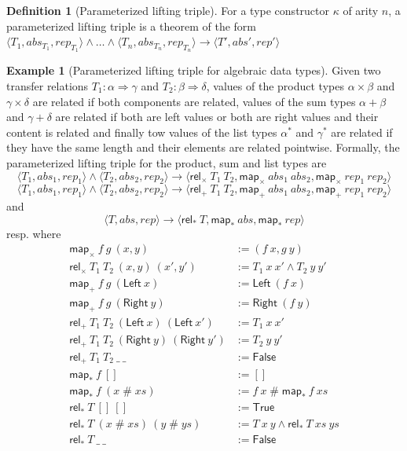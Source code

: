 \documentclass[]{article}
\theoremstyle{definition}
\newtheorem{definition}{Definition}[section]
\newtheorem{example}{Example}[section]
\newcommand{\mapsum}{\mathsf{map_+}}
\newcommand{\mapprod}{\mathsf{map_\times}}
\newcommand{\maplist}{\mathsf{map_\ast}}
\newcommand{\relsum}{\mathsf{rel_+}}
\newcommand{\relprod}{\mathsf{rel_\times}}
\newcommand{\rellist}{\mathsf{rel_\ast}}
\newcommand{\Left}{\mathsf{Left}}
\newcommand{\Right}{\mathsf{Right}}
\newcommand{\true}{\mathsf{True}}
\newcommand{\false}{\mathsf{False}}
\newcommand{\cons}{\mathbin{\#}}
\begin{document}
\begin{definition}[Parameterized lifting triple]
	For a type constructor \(\kappa\) of arity \(n\), a parameterized lifting triple is a theorem of the form \(\langle T_1, abs_{T_1}, rep_{T_1}\rangle \land \ldots \land \langle T_n, abs_{T_n}, rep_{T_n}\rangle \longrightarrow \langle T', abs', rep' \rangle\)
\end{definition}

\begin{example}[Parameterized lifting triple for algebraic data types]
	Given two transfer relations \(T_1 : \alpha \Rightarrow \gamma\) and \(T_2 : \beta \Rightarrow \delta\), values of the product types \(\alpha \times \beta\) and \(\gamma \times \delta\) are related if both components are related, values of the sum types \(\alpha + \beta\) and \(\gamma + \delta\) are related if both are left values or both are right values and their content is related and finally tow values of the list types \(\alpha^\ast\) and \(\gamma^\ast\) are related if they have the same length and their elements are related pointwise. Formally, the parameterized lifting triple for the product, sum and list types are
	\begin{equation*}
		\langle T_1, abs_1, rep_1 \rangle \land \langle T_2, abs_2, rep_2 \rangle \longrightarrow \langle \relprod\ T_1\ T_2, \mapprod\ abs_1\ abs_2, \mapprod\ rep_1\ rep_2 \rangle
	\end{equation*}
	\begin{equation*}
		\langle T_1, abs_1, rep_1 \rangle \land \langle T_2, abs_2, rep_2 \rangle \longrightarrow \langle \relsum\ T_1\ T_2, \mapsum\ abs_1\ abs_2, \mapsum\ rep_1\ rep_2 \rangle
	\end{equation*}
	and
	\begin{equation*}
		\langle T, abs, rep \rangle \longrightarrow \langle \rellist\ T, \maplist\ abs, \maplist\ rep \rangle
	\end{equation*}
	resp. where
	\begin{align*}
		\mapprod\ f\ g\ (x, y) &:= (f\ x, g\ y) \\
		\relprod\ T_1\ T_2\ (x, y)\ (x', y') &:= T_1\ x\ x' \land T_2\ y\ y' \\
		\mapsum\ f\ g\ (\Left\ x) &:= \Left\ (f\ x) \\
		\mapsum\ f\ g\ (\Right\ y) &:= \Right\ (f\ y) \\
		\relsum\ T_1\ T_2\ (\Left\ x)\ (\Left\ x') &:= T_1\ x\ x' \\
		\relsum\ T_1\ T_2\ (\Right\ y)\ (\Right\ y') &:= T_2\ y\ y' \\
		\relsum\ T_1\ T_2\ \_\ \_ &:= \false \\
		\maplist\ f\ [] &:= [] \\
		\maplist\ f\ (x \cons xs) &:= f\ x \cons \maplist\ f\ xs \\
		\rellist\ T\ []\ [] &:= \true \\
		\rellist\ T\ (x \cons xs)\ (y \cons ys) &:= T\ x\ y \land \rellist\ T\ xs\ ys \\
		\rellist\ T\ \_\ \_ &:= \false \\
	\end{align*}
\end{example}
\end{document}
